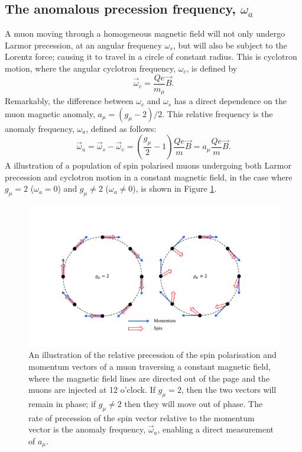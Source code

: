 \subsection{The anomalous precession frequency, $\omega_{a}$}

A muon moving through a homogeneous magnetic field will not only undergo Larmor precession, at an angular frequency $\omega_{s}$, but will also be subject to the Lorentz force; causing it to travel in a circle of constant radius. This is cyclotron motion, where the angular cyclotron frequency, $\omega_{c}$, is defined by 
%
\begin{equation}
  \vec{\omega}_{c}=\frac{Qe}{m_{\mu}}\vec{B}.
  \label{eqn:Cyclotron}
\end{equation}
%
Remarkably, the difference between $\omega_{c}$ and $\omega_{s}$ has a direct dependence on the muon magnetic anomaly, $a_{\mu}=(g_{\mu}-2)/2$. This relative frequency is the anomaly frequency, $\omega_{a}$, defined as follows:
%
\begin{equation}
  \vec{\omega}_{a}=\vec{\omega}_{s}-\vec{\omega}_{c}=\left( \frac{g_{\mu}}{2}-1 \right)\frac{Qe}{m}\vec{B}=a_{\mu}\frac{Qe}{m}\vec{B}.
  \label{eqn:omega_a}
\end{equation}
%
A illustration of a population of spin polarised muons undergoing both Larmor precession and cyclotron motion in a constant magnetic field, in the case where $g_{\mu}=2$ ($\omega_{a}=0$) and $g_{\mu}\neq2$ ($\omega_{a}\neq0$), is shown in Figure \ref{fig:AnomalyFreq}. 

\begin{figure}[t!]
\centering{}
\includegraphics[trim={2cm 2cm 2cm 2cm},clip,width=\textwidth]{Images/Chapter2/AnomalyFrequencyCartoon.pdf}
\caption{An illustration of the relative precession of the spin polarisation and momentum vectors of a muon traversing a constant magnetic field, where the magnetic field lines are directed out of the page and the muons are injected at 12 o'clock. If $g_{\mu}=2$, then the two vectors will remain in phase; if $g_{\mu}\neq2$ then they will move out of phase. The rate of precession of the spin vector relative to the momentum vector is the anomaly frequency, $\vec{\omega}_{a}$, enabling a direct measurement of $a_{\mu}$.} 
\label{fig:AnomalyFreq}
\end{figure}

